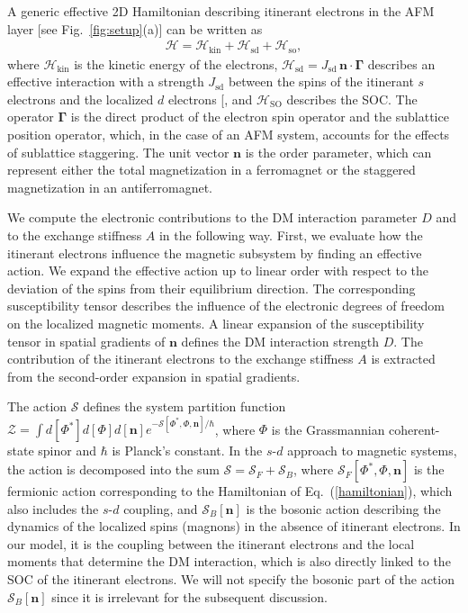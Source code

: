 \documentclass[aps,prl,twocolumn,amsmath,amssymb,superscriptaddress]{revtex4}%
\renewcommand{\cite}[1]{{[}\onlinecite{#1}{]}}
\newcommand{\bb}{\boldsymbol}
\begin{document}
A generic effective 2D Hamiltonian describing itinerant electrons in the AFM layer [see Fig.~\ref{fig:setup}(a)] can be written as
\begin{align}
\mathcal{H}=\mathcal{H}_{\mathrm{kin}}+\mathcal{H}_{\mathrm{sd}}+\mathcal{H}_{\mathrm{so}}, \label{hamiltonian}
\end{align}
where $\mathcal{H}_{\mathrm{kin}}$ is the kinetic energy of the electrons, $\mathcal{H}_{\mathrm{sd}}=J_{\mathrm{sd}}\,\bm{n} \cdot \bm{\Gamma}$ describes an effective interaction with a strength $J_{\mathrm{sd}}$ between the spins of the itinerant $s$ electrons and the localized $d$ electrons \cite{sd-model-referee-suggested}, and $\mathcal{H}_{\mathrm{SO}}$ describes the SOC. The operator $\bm{\Gamma}$ is the direct product of the electron spin operator and the sublattice position operator, which, in the case of an AFM system, accounts for the effects of sublattice staggering. The unit vector $\bm{n}$ is the order parameter, which can represent either the total magnetization in a ferromagnet or the staggered magnetization in an antiferromagnet.

We compute the electronic contributions to the DM interaction parameter $D$ and to the exchange stiffness $A$ in the following way. First, we evaluate how the itinerant electrons influence the magnetic subsystem by finding an effective action. We expand the effective action up to linear order with respect to the deviation of the spins from their equilibrium direction. The corresponding susceptibility tensor describes the influence of the electronic degrees of freedom on the localized magnetic moments. A linear expansion of the susceptibility tensor in spatial gradients of $\bb{n}$ defines the DM interaction strength $D$. The contribution of the itinerant electrons to the exchange stiffness $A$ is extracted from the second-order expansion in spatial gradients.

The action $\mathcal{S}$ defines the system partition function $\mathcal{Z}=\int d[\Phi^*] d[\Phi] d[\bm{n}] e^{-\mathcal{S}[\Phi^*,\Phi,\bm{n}]/\hbar}$, where $\Phi$ is the Grassmannian coherent-state spinor and $\hbar$ is Planck's constant. In the $s$-$d$ approach to magnetic systems, the action is decomposed into the sum $\mathcal{S}=\mathcal{S}_F+\mathcal{S}_B$, where $\mathcal{S}_F[\Phi^*,\Phi,\bm{n}]$ is the fermionic action corresponding to the Hamiltonian of Eq.~(\ref{hamiltonian}), which also includes the $s$-$d$ coupling, and $\mathcal{S}_B[\bm{n}]$ is the bosonic action describing the dynamics of the localized spins (magnons) in the absence of itinerant electrons. In our model, it is the coupling between the itinerant electrons and the local moments that determine the DM interaction, which is also directly linked to the SOC of the itinerant electrons. We will not specify the bosonic part of the action $\mathcal{S}_B[\bm{n}]$ since it is irrelevant for the subsequent discussion.
\end{document}
